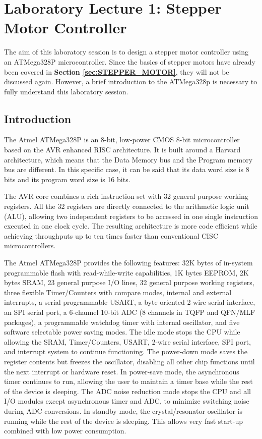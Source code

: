 \section{Laboratory Lecture 1: Stepper Motor Controller}

The aim of this laboratory session is to design a stepper motor controller using an ATMega328P microcontroller. Since the basics of stepper motors have already been covered in \textbf{Section \ref{sec:STEPPER_MOTOR}}, they will not be discussed again. However, a brief introduction to the ATMega328p is necessary to fully understand this laboratory session.

\subsection{Introduction}

The Atmel ATMega328P is an 8-bit, low-power CMOS 8-bit microcontroller based on the AVR enhanced RISC architecture. It is built around a Harvard architecture, which means that the Data Memory bus and the Program memory bus are different. In this specific case, it can be said that its data word size is 8 bits and its program word size is 16 bits.\medskip 

The AVR core combines a rich instruction set with 32 general purpose working registers. All the 32 registers are directly connected to the arithmetic logic unit (ALU), allowing two independent registers to be accessed in one single instruction executed in one clock cycle. The resulting architecture is more code efficient while achieving throughputs up to ten times faster than conventional CISC microcontrollers.\medskip

The Atmel ATMega328P provides the following features: 32K bytes of in-system programmable flash with read-while-write capabilities, 1K bytes EEPROM, 2K bytes SRAM, 23 general purpose I/O lines, 32 general purpose working registers, three flexible Timer/Counters with compare modes, internal and external interrupts, a serial programmable USART, a byte oriented 2-wire serial interface, an SPI serial port, a 6-channel 10-bit ADC (8 channels in TQFP and QFN/MLF packages), a programmable watchdog timer with internal oscillator, and five software selectable power saving modes. The idle mode stops the CPU while allowing the SRAM, Timer/Counters, USART, 2-wire serial interface, SPI port, and interrupt system to continue functioning. The power-down mode saves the register contents but freezes the oscillator, disabling all other chip functions until the next interrupt or hardware reset. In power-save mode, the asynchronous timer continues to run, allowing the user to maintain a timer base while the rest of the device is sleeping. The ADC noise reduction mode stops the CPU and all I/O modules except asynchronous timer and ADC, to minimize switching noise during ADC conversions. In standby mode, the crystal/resonator oscillator is running while the rest of the device is sleeping. This allows very fast start-up combined with low power consumption.\medskip

